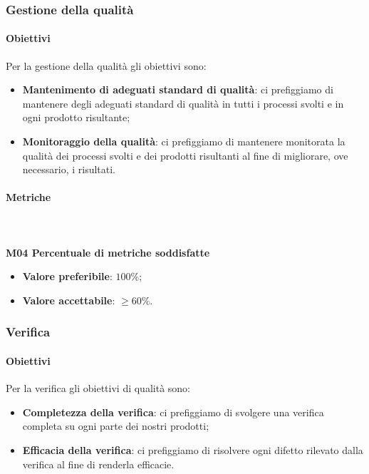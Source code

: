 		\subsubsection{Gestione della qualità}
			\paragraph{Obiettivi}
			Per la gestione della qualità gli obiettivi sono:
			\begin{itemize}
				\item \textbf{Mantenimento di adeguati standard di qualità}: ci prefiggiamo di mantenere degli adeguati standard di qualità in tutti i processi svolti e in ogni prodotto risultante;
				\item \textbf{Monitoraggio della qualità}: ci prefiggiamo di mantenere monitorata la qualità dei processi svolti e dei prodotti risultanti al fine di migliorare, ove necessario, i risultati.
			\end{itemize}	 
			\paragraph{Metriche} \mbox{} \\ \\
				\textbf{M04 Percentuale di metriche soddisfatte}
				\begin{itemize}
					\item \textbf{Valore preferibile}: $100\%$;
					\item \textbf{Valore accettabile}: $\ge 60\%$.
				\end{itemize}
		\subsubsection{Verifica}
			\paragraph{Obiettivi}
			Per la verifica gli obiettivi di qualità sono:
			\begin{itemize}
				\item \textbf{Completezza della verifica}: ci prefiggiamo di svolgere una verifica completa su ogni parte dei nostri prodotti;
				\item \textbf{Efficacia della verifica}: ci prefiggiamo di risolvere ogni difetto rilevato dalla verifica al fine di renderla efficacie.
			\end{itemize}
